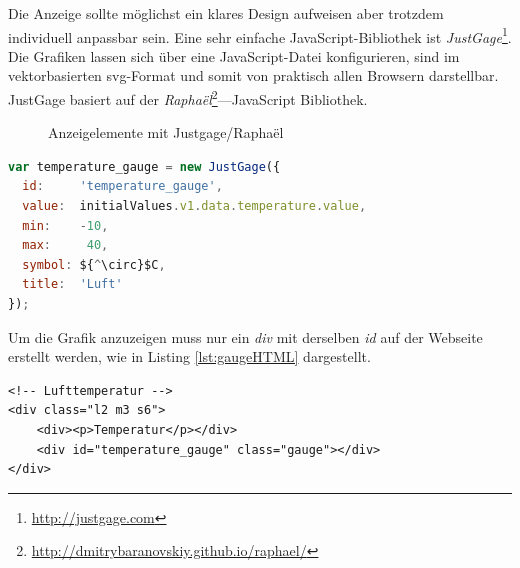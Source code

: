 Die Anzeige sollte möglichst ein klares Design aufweisen aber trotzdem individuell anpassbar sein. Eine sehr einfache JavaScript-Bibliothek ist \textit{JustGage}\footnote{ \url{http://justgage.com}}. Die Grafiken lassen sich über eine JavaScript-Datei konfigurieren, sind im vektorbasierten svg-Format und somit von praktisch allen Browsern darstellbar. JustGage basiert auf der \textit{Raphaël}\footnote{ \url{http://dmitrybaranovskiy.github.io/raphael/}}—JavaScript Bibliothek.

\begin{figure}[h!]
	\centering
	\caption{Anzeigelemente mit Justgage/Raphaël}
	\label{img:gauges}
\end{figure}




\begin{lstlisting}[label=lst:gaugeJS,caption=Konfiguration der Gauge, language=JavaScript, mathescape, style=htmlcssjs]
var temperature_gauge = new JustGage({
  id:     'temperature_gauge',
  value:  initialValues.v1.data.temperature.value,
  min:    -10,
  max:     40,
  symbol: ${^\circ}$C,
  title:  'Luft'
});
\end{lstlisting}

Um die Grafik anzuzeigen muss nur ein \emph{div} mit derselben \emph{id} auf der Webseite erstellt werden, wie in Listing \ref{lst:gaugeHTML} dargestellt.

\vspace{3mm}
\begin{lstlisting}[label=lst:gaugeHTML,caption=Container für die SVG-Grafik (Gauge), language=HTML5, style=htmlcssjs]
<!-- Lufttemperatur -->
<div class="l2 m3 s6">
    <div><p>Temperatur</p></div>
    <div id="temperature_gauge" class="gauge"></div>
</div>
\end{lstlisting}
\vspace{3mm}


